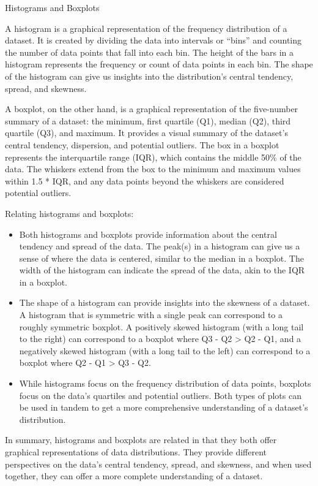 \documentclass[
  letterpaper,
]{latex/krantz}
\providecommand{\tightlist}{%
  \setlength{\itemsep}{0pt}\setlength{\parskip}{0pt}}\usepackage{longtable,booktabs,array}
\begin{document}
\begin{tcolorbox}[enhanced jigsaw, arc=.35mm, leftrule=.75mm, rightrule=.15mm, opacityback=0, colback=white, breakable, bottomrule=.15mm, left=2mm, toprule=.15mm]

Histograms and Boxplots

A histogram is a graphical representation of the frequency distribution
of a dataset. It is created by dividing the data into intervals or
``bins'' and counting the number of data points that fall into each bin.
The height of the bars in a histogram represents the frequency or count
of data points in each bin. The shape of the histogram can give us
insights into the distribution's central tendency, spread, and skewness.

A boxplot, on the other hand, is a graphical representation of the
five-number summary of a dataset: the minimum, first quartile (Q1),
median (Q2), third quartile (Q3), and maximum. It provides a visual
summary of the dataset's central tendency, dispersion, and potential
outliers. The box in a boxplot represents the interquartile range (IQR),
which contains the middle 50\% of the data. The whiskers extend from the
box to the minimum and maximum values within 1.5 * IQR, and any data
points beyond the whiskers are considered potential outliers.

Relating histograms and boxplots:

\begin{itemize}
\tightlist
\item
  Both histograms and boxplots provide information about the central
  tendency and spread of the data. The peak(s) in a histogram can give
  us a sense of where the data is centered, similar to the median in a
  boxplot. The width of the histogram can indicate the spread of the
  data, akin to the IQR in a boxplot.
\item
  The shape of a histogram can provide insights into the skewness of a
  dataset. A histogram that is symmetric with a single peak can
  correspond to a roughly symmetric boxplot. A positively skewed
  histogram (with a long tail to the right) can correspond to a boxplot
  where Q3 - Q2 \textgreater{} Q2 - Q1, and a negatively skewed
  histogram (with a long tail to the left) can correspond to a boxplot
  where Q2 - Q1 \textgreater{} Q3 - Q2.
\item
  While histograms focus on the frequency distribution of data points,
  boxplots focus on the data's quartiles and potential outliers. Both
  types of plots can be used in tandem to get a more comprehensive
  understanding of a dataset's distribution.
\end{itemize}

In summary, histograms and boxplots are related in that they both offer
graphical representations of data distributions. They provide different
perspectives on the data's central tendency, spread, and skewness, and
when used together, they can offer a more complete understanding of a
dataset.

\end{tcolorbox}
\end{document}

